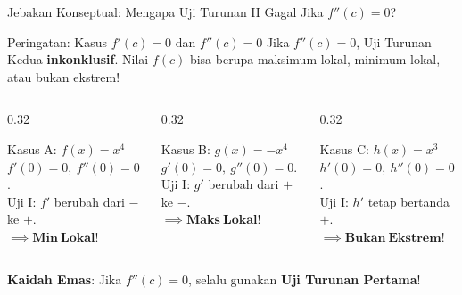 \documentclass[aspectratio=43,10pt]{beamer}
\begin{document}
\begin{frame}{Jebakan Konseptual: Mengapa Uji Turunan II Gagal Jika $f''(c) = 0$?}
    \begin{alertblock}{Peringatan: Kasus $f'(c) = 0$ dan $f''(c) = 0$}
        Jika $f''(c) = 0$, Uji Turunan Kedua \textbf{inkonklusif}. Nilai $f(c)$ bisa berupa maksimum lokal, minimum lokal, atau bukan ekstrem!
    \end{alertblock}

    \vspace{0.06cm}
    \begin{columns}[T]
        \begin{column}{0.32\textwidth}
            \begin{exampleblock}{Kasus A: $f(x) = x^4$}
                $f'(0)=0,\ f''(0)=0$.\\
                \vspace{0.04cm}
                {\scriptsize Uji I: $f'$ berubah dari $-$ ke $+$.}\\
                \vspace{0.04cm}
                $\implies \mathbf{Min\ Lokal}$!
            \end{exampleblock}
        \end{column}

        \begin{column}{0.32\textwidth}
            \begin{alertblock}{Kasus B: $g(x) = -x^4$}
                $g'(0)=0,\ g''(0)=0$.\\
                \vspace{0.04cm}
                {\scriptsize Uji I: $g'$ berubah dari $+$ ke $-$.}\\
                \vspace{0.04cm}
                $\implies \mathbf{Maks\ Lokal}$!
            \end{alertblock}
        \end{column}

        \begin{column}{0.32\textwidth}
            \begin{block}{Kasus C: $h(x) = x^3$}
                $h'(0)=0,\ h''(0)=0$.\\
                \vspace{0.04cm}
                {\scriptsize Uji I: $h'$ tetap bertanda $+$.}\\
                \vspace{0.04cm}
                $\implies \mathbf{Bukan\ Ekstrem}$!
            \end{block}
        \end{column}
    \end{columns}

    \vspace{0.08cm}
    \centering
    {\small \color{LuminousGold} \textbf{Kaidah Emas}: Jika $f''(c) = 0$, selalu gunakan \textbf{Uji Turunan Pertama}!}
\end{frame}
\end{document}
